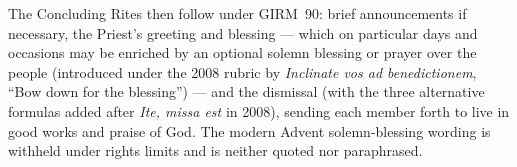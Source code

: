 The Concluding Rites then follow under GIRM~90: brief announcements if necessary, the Priest's greeting and blessing --- which on particular days and occasions may be enriched by an optional solemn blessing or prayer over the people (introduced under the 2008  rubric by \emph{Inclinate vos ad benedictionem}, ``Bow down for the blessing'') --- and the dismissal (with the three alternative formulas added after \emph{Ite, missa est} in 2008), sending each member forth to live in good works and praise of God. The modern Advent solemn-blessing wording is withheld under rights limits and is neither quoted nor paraphrased.
